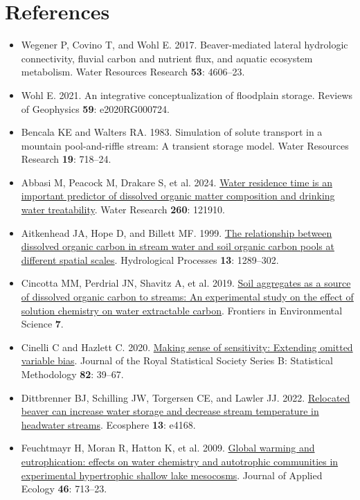 \documentclass[11pt,a4paper]{article}
\begin{document}
\section*{References}
\begin{itemize}\setlength\itemsep{2pt}
\item[] Wegener P, Covino T, and Wohl E. 2017. Beaver-mediated lateral hydrologic connectivity, fluvial carbon and nutrient flux, and aquatic ecosystem metabolism. Water Resources Research \textbf{53}: 4606--23.
\item[] Wohl E. 2021. An integrative conceptualization of floodplain storage. Reviews of Geophysics \textbf{59}: e2020RG000724.
\item[] Bencala KE and Walters RA. 1983. Simulation of solute transport in a mountain pool-and-riffle stream: A transient storage model. Water Resources Research \textbf{19}: 718--24.
\item[] Abbasi M, Peacock M, Drakare S, et al. 2024. \href{https://doi.org/10.1016/j.watres.2024.121910}{Water residence time is an important predictor of dissolved organic matter composition and drinking water treatability}. Water Research \textbf{260}: 121910.
\item[] Aitkenhead JA, Hope D, and Billett MF. 1999. \href{https://doi.org/10.1002/(SICI)1099-1085(19990615)13:8\%3C1289::AID-HYP766\%3E3.0.CO;2-M}{The relationship between dissolved organic carbon in stream water and soil organic carbon pools at different spatial scales}. Hydrological Processes \textbf{13}: 1289--302.
\item[] Cincotta MM, Perdrial JN, Shavitz A, et al. 2019. \href{https://doi.org/10.3389/fenvs.2019.00172}{Soil aggregates as a source of dissolved organic carbon to streams: An experimental study on the effect of solution chemistry on water extractable carbon}. Frontiers in Environmental Science \textbf{7}.
\item[] Cinelli C and Hazlett C. 2020. \href{https://doi.org/10.1111/rssb.12348}{Making sense of sensitivity: Extending omitted variable bias}. Journal of the Royal Statistical Society Series B: Statistical Methodology \textbf{82}: 39--67.
\item[] Dittbrenner BJ, Schilling JW, Torgersen CE, and Lawler JJ. 2022. \href{https://doi.org/10.1002/ecs2.4168}{Relocated beaver can increase water storage and decrease stream temperature in headwater streams}. Ecosphere \textbf{13}: e4168.
\item[] Feuchtmayr H, Moran R, Hatton K, et al. 2009. \href{https://doi.org/10.1111/j.1365-2664.2009.01644.x}{Global warming and eutrophication: effects on water chemistry and autotrophic communities in experimental hypertrophic shallow lake mesocosms}. Journal of Applied Ecology \textbf{46}: 713--23.

\end{itemize}
\end{document}
